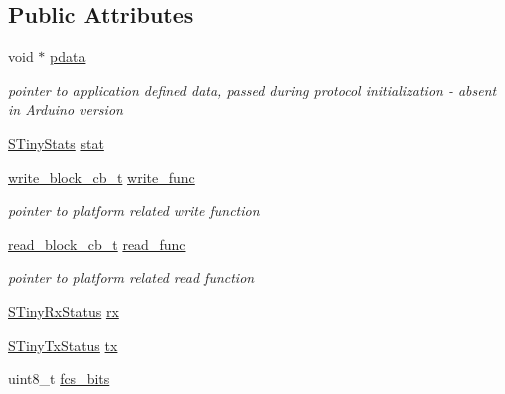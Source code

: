 \subsection*{Public Attributes}
\begin{DoxyCompactItemize}
\item 
\hypertarget{structSTinyData_a3ac48d44af9b2912dd980c7377a020be}{}void $\ast$ \hyperlink{structSTinyData_a3ac48d44af9b2912dd980c7377a020be}{pdata}\label{structSTinyData_a3ac48d44af9b2912dd980c7377a020be}

\begin{DoxyCompactList}\small\item\em pointer to application defined data, passed during protocol initialization -\/ absent in Arduino version \end{DoxyCompactList}\item 
\hyperlink{structSTinyStats}{S\+Tiny\+Stats} \hyperlink{structSTinyData_a16ba8c9e60d6aee3fcd4909f85561f3d}{stat}
\item 
\hypertarget{structSTinyData_a26c40b0b7e18776af99745624c460c5a}{}\hyperlink{tiny__layer2_8h_a7f69e669de5baa69a43ee5cb439a7496}{write\+\_\+block\+\_\+cb\+\_\+t} \hyperlink{structSTinyData_a26c40b0b7e18776af99745624c460c5a}{write\+\_\+func}\label{structSTinyData_a26c40b0b7e18776af99745624c460c5a}

\begin{DoxyCompactList}\small\item\em pointer to platform related write function \end{DoxyCompactList}\item 
\hypertarget{structSTinyData_a9714041284fd99230be0e7efbc8c60cf}{}\hyperlink{tiny__layer2_8h_ae3d867e030f59de94508902f2b84a7ec}{read\+\_\+block\+\_\+cb\+\_\+t} \hyperlink{structSTinyData_a9714041284fd99230be0e7efbc8c60cf}{read\+\_\+func}\label{structSTinyData_a9714041284fd99230be0e7efbc8c60cf}

\begin{DoxyCompactList}\small\item\em pointer to platform related read function \end{DoxyCompactList}\item 
\hyperlink{structSTinyRxStatus}{S\+Tiny\+Rx\+Status} \hyperlink{structSTinyData_aa3b43db99a1a6bf3d562f932d5a539db}{rx}
\item 
\hyperlink{structSTinyTxStatus}{S\+Tiny\+Tx\+Status} \hyperlink{structSTinyData_aa099adb35f3494332747eb18851fbb23}{tx}
\item 
\hypertarget{structSTinyData_a3cf4d6009cc472630e20a68d6fa50186}{}uint8\+\_\+t \hyperlink{structSTinyData_a3cf4d6009cc472630e20a68d6fa50186}{fcs\+\_\+bits}\label{structSTinyData_a3cf4d6009cc472630e20a68d6fa50186}


\end{DoxyCompactItemize}
